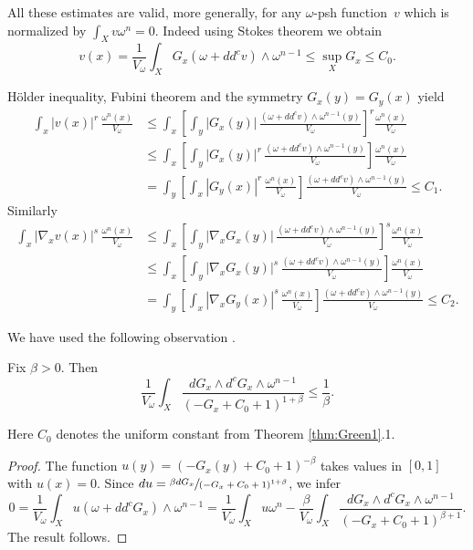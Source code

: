 \begin{rem}
All these estimates are valid, more generally, for any $\omega$-psh function~$v$ which is
normalized by $\int_X v \omega^n=0$. Indeed using Stokes theorem we obtain
\[
v(x) =\frac{1}{V_{\omega}} \int_X G_x (\omega+dd^c v) \wedge \omega^{n-1} \leq \sup_X G_x \leq C_0.
\]

Hölder inequality, Fubini theorem and the symmetry $G_x(y)=G_y(x)$ yield
\begin{align*}
\int_x |v(x)|^r \,\frac{\omega^n(x)}{V_{\omega}}
&\leq  \int_x \left[ \int_y |G_x(y)|\, \frac{(\omega+dd^c v) \wedge \omega^{n-1}(y)}{V_{\omega}} \right]^r \frac{\omega^n(x)}{V_{\omega}} \\
&\leq  \int_x \left[ \int_y |G_x(y)|^r\, \frac{(\omega+dd^c v) \wedge \omega^{n-1}(y)}{V_{\omega}} \right] \frac{\omega^n(x)}{V_{\omega}} \\
&= \int_y \left[ \int_x |G_y(x)|^r\, \frac{\omega^n(x)}{V_{\omega}} \right] \frac{(\omega+dd^c v) \wedge \omega^{n-1}(y)}{V_{\omega}} \leq C_1.
\end{align*}
Similarly
\begin{align*}
\int_x |\nabla_x v(x)|^s \,\frac{\omega^n(x)}{V_{\omega}}
&\leq  \int_x \left[ \int_y | \nabla_x G_x(y)|\, \frac{(\omega+dd^c v) \wedge \omega^{n-1}(y)}{V_{\omega}} \right]^s \frac{\omega^n(x)}{V_{\omega}} \\
&\leq  \int_x \left[ \int_y |\nabla_x G_x(y)|^s\, \frac{(\omega+dd^c v) \wedge \omega^{n-1}(y)}{V_{\omega}} \right] \frac{\omega^n(x)}{V_{\omega}} \\
&= \int_y \left[ \int_x |\nabla_x G_y(x)|^s\, \frac{\omega^n(x)}{V_{\omega}} \right] \frac{(\omega+dd^c v) \wedge \omega^{n-1}(y)}{V_{\omega}} \leq C_2.
\end{align*}
\end{rem}

We have used the following observation \cite[Lem.\,5.6]{GPSS22}.

\begin{lem} \label{lem:weightedgradient}
Fix $\beta>0$. Then
\[
\frac{1}{V_{\omega}} \int_X \frac{d G_x \wedge d^c G_x \wedge \omega^{n-1}}{(-G_x+C_0+1)^{1+\beta}} \leq \frac{1}{\beta}.
\]
\end{lem}

Here $C_0$ denotes the uniform constant from Theorem \ref{thm:Green1}.1.

\begin{proof}
The function $u(y)=(-G_x(y)+C_0+1)^{-\beta}$ takes values in $[0,1]$ with $u(x)=0$.
Since $du=\sfrac{\beta dG_x}{(-G_x+C_0+1)^{1+\beta}}$, we infer
\[
0=\frac{1}{V_{\omega}} \int_X u (\omega+dd^c G_x) \wedge \omega^{n-1}
=\frac{1}{V_{\omega}} \int_X u \omega^{n}
- \frac{\beta}{V_{\omega}} \int_X \frac{d G_x \wedge d^c G_x \wedge \omega^{n-1}}{(-G_x+C_0+1)^{\beta+1}}.
\]
The result follows.
\end{proof}

